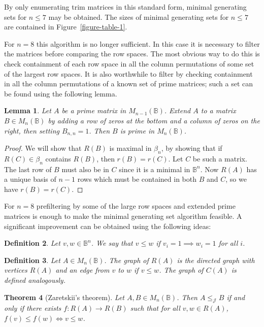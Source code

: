 \documentclass[11pt]{article}
\newtheorem{thm}{Theorem}[section]
\newtheorem{lemma}[thm]{Lemma}
\newtheorem{defi}[thm]{Definition}
\numberwithin{equation}{section}
\renewcommand{\to}{\longrightarrow}
\newcommand{\B}{\mathbb{B}}
\newcommand{\Bn}{M_n(\B)}
\newcommand{\J}{\mathscr{J}}
\begin{document}
By only enumerating trim matrices in this standard form, minimal generating sets
for $n \leq 7$ may be obtained.
The sizes of minimal generating sets for $n \leq 7$ are contained in
Figure~\ref{figure-table-1}.

For $n=8$ this algorithm is no longer sufficient. In this case it is necessary
to filter the matrices before comparing the row spaces. The most obvious way
to do this is check containment of each row space in all the column permutations
of some set of the largest row spaces. It is also worthwhile to filter by
checking containment in all the column permutations of a known set of prime
matrices; such a set can be found using the following lemma.

\begin{lemma}
  Let $A$ be a prime matrix in $M_{n-1}(\B)$. Extend $A$ to a matrix $B \in \Bn$
  by adding a row of zeros at the bottom and a column of zeros on the right,
  then setting $B_{n,n} = 1$. Then $B$ is prime in $\Bn$.
\end{lemma}
\begin{proof}
  We will show that $R(B)$ is maximal in $\beta_n$, by showing that if 
  $R(C) \in \beta_n$ contains $R(B)$, then $r(B) = r(C)$.
  Let $C$ be such a matrix.
  The last row of $B$ must also be in $C$ since it is a minimal in $\B^{n}$. 
  Now $R(A)$ has a unique basis of $n-1$ rows which must be contained in both $B$ and
  $C$, so we have $r(B) = r(C)$.
\end{proof}

For $n=8$ prefiltering by some of the large row spaces and extended prime
matrices is enough to make the minimal generating set algorithm feasible.
A significant improvement can be obtained using the following ideas:

\begin{defi}
  Let $v, w \in \B^n$. We say that $v \leq w$ if $v_i = 1 \implies w_i = 1$ for all $i$.
\end{defi}

\begin{defi}
  Let $A \in \Bn$. The \emph{graph} of $R(A)$ is the directed graph with vertices $R(A)$ and an edge from $v$ to $w$ if $v \leq w$. The graph of $C(A)$ is defined analogously. 
\end{defi}

\begin{thm}[Zaretskii's theorem]
  Let $A, B \in \Bn$. Then $A \leq_{\J} B$ if and only if there exists 
  $f: R(A) \to R(B)$ such that for all $v, w \in R(A)$, $f(v) \leq f(w) \iff
  v \leq w$.
\end{thm}
\end{document}
